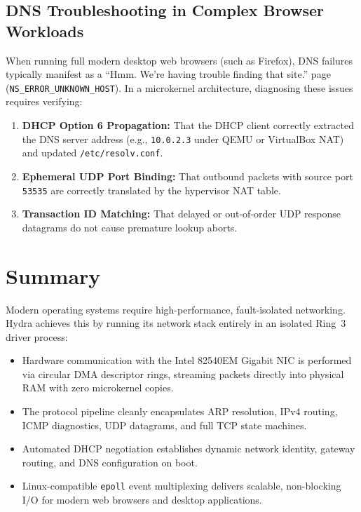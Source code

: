 \subsection{DNS Troubleshooting in Complex Browser Workloads}
When running full modern desktop web browsers (such as Firefox), DNS failures typically manifest as a ``Hmm. We're having trouble finding that site.'' page (\texttt{NS\_ERROR\_UNKNOWN\_HOST}). In a microkernel architecture, diagnosing these issues requires verifying:
\begin{enumerate}
    \item \textbf{DHCP Option 6 Propagation:} That the DHCP client correctly extracted the DNS server address (e.g., \texttt{10.0.2.3} under QEMU or VirtualBox NAT) and updated \texttt{/etc/resolv.conf}.
    \item \textbf{Ephemeral UDP Port Binding:} That outbound packets with source port \texttt{53535} are correctly translated by the hypervisor NAT table.
    \item \textbf{Transaction ID Matching:} That delayed or out-of-order UDP response datagrams do not cause premature lookup aborts.
\end{enumerate}

\section{Summary}
\label{sec:summary_chap6}

Modern operating systems require high-performance, fault-isolated networking. Hydra achieves this by running its network stack entirely in an isolated Ring~3 driver process:
\begin{itemize}
    \item Hardware communication with the Intel 82540EM Gigabit NIC is performed via circular DMA descriptor rings, streaming packets directly into physical RAM with zero microkernel copies.
    \item The protocol pipeline cleanly encapsulates ARP resolution, IPv4 routing, ICMP diagnostics, UDP datagrams, and full TCP state machines.
    \item Automated DHCP negotiation establishes dynamic network identity, gateway routing, and DNS configuration on boot.
    \item Linux-compatible \texttt{epoll} event multiplexing delivers scalable, non-blocking I/O for modern web browsers and desktop applications.
\end{itemize}

